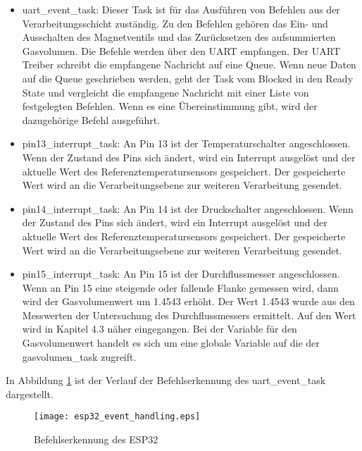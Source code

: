 \begin{itemize}
	\item uart\_event\_task: Dieser Task ist für das Ausführen von Befehlen aus der Verarbeitungsschicht zuständig. Zu den Befehlen gehören das Ein- und Ausschalten des Magnetventils und das Zurücksetzen des aufsummierten Gasvolumen. Die Befehle werden über den UART empfangen. Der UART Treiber schreibt die empfangene Nachricht auf eine Queue. Wenn neue Daten auf die Queue geschrieben werden, geht der Task vom Blocked in den Ready State und vergleicht die empfangene Nachricht mit einer Liste von festgelegten Befehlen. Wenn es eine Übereinstimmung gibt, wird der dazugehörige Befehl ausgeführt.
	
	\item pin13\_interrupt\_task: An Pin 13 ist der Temperaturschalter angeschlossen. Wenn der Zustand des Pins sich ändert, wird ein Interrupt ausgelöst und der aktuelle Wert des Referenztemperatursensors gespeichert. Der gespeicherte Wert wird an die Verarbeitungsebene zur weiteren Verarbeitung gesendet.
	
	\item pin14\_interrupt\_task: An Pin 14 ist der Druckschalter angeschlossen. Wenn der Zustand des Pins sich ändert, wird ein Interrupt ausgelöst und der aktuelle Wert des Referenztemperatursensors gespeichert. Der gespeicherte Wert wird an die Verarbeitungsebene zur weiteren Verarbeitung gesendet.
	
	\item pin15\_interrupt\_task: An Pin 15 ist der Durchflussmesser angeschlossen. Wenn an Pin 15 eine steigende oder fallende Flanke gemessen wird, dann wird der Gasvolumenwert um 1.4543 erhöht. Der Wert 1.4543 wurde aus den Messwerten der Untersuchung des Durchflussmessers ermittelt. Auf den Wert wird in Kapitel 4.3 näher eingegangen. Bei der Variable für den Gasvolumenwert handelt es sich um eine globale Variable auf die der gasvolumen\_task zugreift.
\end{itemize}

\noindent
In Abbildung \ref{esp32_event_handling} ist der Verlauf der Befehlserkennung des uart\_event\_task dargestellt.
\begin{figure}[h]
\centering
\texttt{[image: esp32\_event\_handling.eps]}
\caption{Befehlserkennung des ESP32}
\label{esp32_event_handling}
\end{figure}


